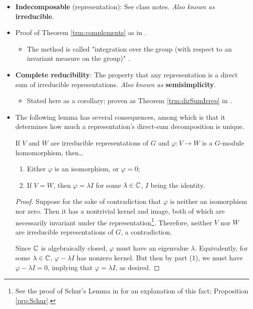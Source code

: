 \documentclass[../notes.tex]{subfiles}
\begin{document}
\begin{itemize}
    \item \textbf{Indecomposable} (representation): See class notes. \emph{Also known as} \textbf{irreducible}.
    \item Proof of Theorem \ref{trm:complements} as in \textcite{bib:Serre}.
    \begin{itemize}
        \item The method is called "integration over the group (with respect to an invariant measure on the group)" \parencite[6]{bib:FultonHarris}.
    \end{itemize}
    \item \textbf{Complete reducibility}: The property that any representation is a direct sum of irreducible representations. \emph{Also known as} \textbf{semisimplicity}.
    \begin{itemize}
        \item Stated here as a corollary; proven as Theorem \ref{trm:dirSumIrrep} in \textcite{bib:Serre}.
    \end{itemize}
    \item The following lemma has several consequences, among which is that it determines how much a representation's direct-sum decomposition is unique.
    \setcounter{FHchapter}{1}
    \setcounter{FHlemma}{6}
    \begin{FHlemma}\label{lem:Schur}
        If $V$ and $W$ are irreducible representations of $G$ and $\varphi:V\to W$ is a $G$-module homomorphism, then\dots
        \begin{enumerate}
            \item Either $\varphi$ is an isomorphism, or $\varphi=0$;
            \item If $V=W$, then $\varphi=\lambda I$ for some $\lambda\in\mathbb{C}$, $I$ being the identity.
        \end{enumerate}
        \begin{proof}
            Suppose for the sake of contradiction that $\varphi$ is neither an isomorphism nor zero. Then it has a nontrivial kernel and image, both of which are necessarily invariant under the representation\footnote{See the proof of Schur's Lemma in \textcite{bib:Serre} for an explanation of this fact; Proposition \ref{prp:Schur}.}. Therefore, neither $V$ nor $W$ are irreducible representations of $G$, a contradiction.\par
            Since $\mathbb{C}$ is algebraically closed, $\varphi$ must have an eigenvalue $\lambda$. Equivalently, for some $\lambda\in\mathbb{C}$, $\varphi-\lambda I$ has nonzero kernel. But then by part (1), we must have $\varphi-\lambda I=0$, implying that $\varphi=\lambda I$, as desired.

\end{proof}
\end{FHlemma}
\end{itemize}
\end{document}
